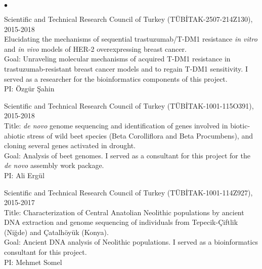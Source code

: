 \documentclass[margin,line]{res}
\newenvironment{list2}{
  \begin{list}{$\bullet$}{%
      \setlength{\itemsep}{0.1cm}
      \setlength{\parsep}{0in} \setlength{\parskip}{0in}
      \setlength{\topsep}{0in} \setlength{\partopsep}{0in} 
      \setlength{\leftmargin}{0.2in}}}{\end{list}}
\begin{document}
\begin{resume}
\begin{list2}
                                         \item
                                         Scientific and Technical Research Council of Turkey (T\"{U}B\.{I}TAK-2507-214Z130), 2015-2018\\
                                         Elucidating the mechanisms of sequential trastuzumab/T-DM1 resistance \textit{in vitro} and \textit{in vivo} models of HER-2
                                         overexpressing breast cancer.\\
                                         Goal: Unraveling molecular mechanisms of acquired T-DM1 resistance in trastuzumab-resistant breast 
                                         cancer models and to regain T-DM1 sensitivity. I served as a researcher 
                                         for the bioinformatics components of this project.\\
                                         PI: Özgür Şahin
                                       \item
                                         Scientific and Technical Research Council of Turkey (T\"{U}B\.{I}TAK-1001-115O391), 2015-2018\\
                                         Title: {\it de novo} genome sequencing and identification of genes involved in biotic-abiotic stress of wild beet species 
                                         (Beta Corolliflora and Beta Procumbens), and cloning several genes activated in drought.\\
                                         Goal: Analysis of beet genomes. I served as a consultant for this project for the {\it de novo} assembly work package.\\
                                         PI: Ali Ergül

                                        \item
                                         Scientific and Technical Research Council of Turkey (T\"{U}B\.{I}TAK-1001-114Z927), 2015-2017\\
                                         Title: Characterization of Central Anatolian Neolithic populations by ancient DNA extraction and genome sequencing of individuals 
                                         from Tepecik-Çiftlik (Niğde) and Çatalhöyük (Konya).\\
                                         Goal: Ancient DNA analysis of Neolithic populations. I served as a bioinformatics consultant for this project.\\
                                         PI: Mehmet Somel


\end{list2}
\end{resume}
\end{document}
